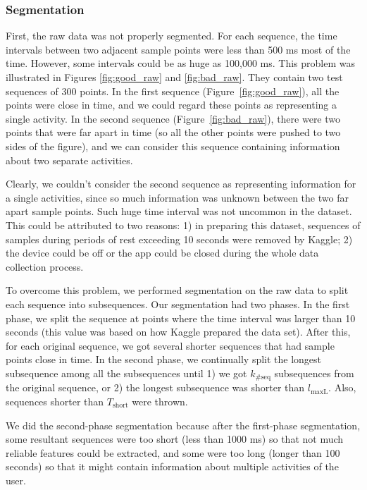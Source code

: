 \documentclass{article} %
\begin{document}
\subsubsection{Segmentation} %
First, the raw data was not properly segmented. For each sequence, the time intervals between two adjacent sample points were less than 500 ms most of the time. However, some intervals could be as huge as 100,000 ms. This problem was illustrated in Figures \ref{fig:good_raw} and \ref{fig:bad_raw}. They contain two test sequences of 300 points. In the first sequence (Figure~\ref{fig:good_raw}), all the points were close in time, and we could regard these points as representing a single activity. In the second sequence (Figure~\ref{fig:bad_raw}), there were two points that were far apart in time (so all the other points were pushed to two sides of the figure), and we can consider this sequence containing information about two separate activities. 

Clearly, we couldn't consider the second sequence as representing information for a single activities, since so much information was unknown between the two far apart sample points. Such huge time interval was not uncommon in the dataset. This could be attributed to two reasons: 1) in preparing this dataset, sequences of samples during periods of rest exceeding 10 seconds were removed by Kaggle; 2) the device could be off or the app could be closed during the whole data collection process. 

To overcome this problem, we performed segmentation on the raw data to split each sequence into subsequences. Our segmentation had two phases. In the first phase, we split the sequence at points where the time interval was larger than 10 seconds (this value was based on how Kaggle prepared the data set). After this, for each original sequence, we got several shorter sequences that had sample points close in time. In the second phase, we continually split the longest subsequence among all the subsequences until 1) we got $k_\mathrm{\#seq}$ subsequences from the original sequence, or 2) the longest subsequence was shorter than $l_\mathrm{maxL}$. Also, sequences shorter than $T_\mathrm{short}$ were thrown.

We did the second-phase segmentation because after the first-phase segmentation, some resultant sequences were too short (less than 1000 ms) so that not much reliable features could be extracted, and some were too long (longer than 100 seconds) so that it might contain information about multiple activities of the user. 
\end{document}
